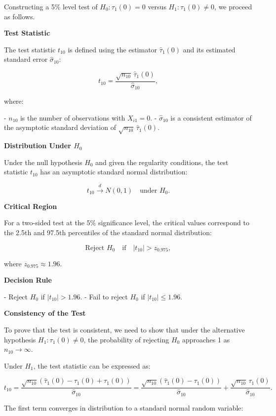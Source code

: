 \documentclass{article}
\begin{document}
Constructing a 5\% level test of \( H_0 : \tau_1(0) = 0 \) versus \( H_1 : \tau_1(0) \neq 0 \), we proceed as follows.

\textbf{Test Statistic}

The test statistic \( t_{10} \) is defined using the estimator \( \hat{\tau}_1(0) \) and its estimated standard error \( \hat{\sigma}_{10} \):

\[
t_{10} = \frac{\sqrt{n_{10}} \, \hat{\tau}_1(0)}{\hat{\sigma}_{10}},
\]

where:

- \( n_{10} \) is the number of observations with \( X_{i1} = 0 \).
- \( \hat{\sigma}_{10} \) is a consistent estimator of the asymptotic standard deviation of \( \sqrt{n_{10}} \, \hat{\tau}_1(0) \).

\textbf{Distribution Under \( H_0 \)}

Under the null hypothesis \( H_0 \) and given the regularity conditions, the test statistic \( t_{10} \) has an asymptotic standard normal distribution:

\[
t_{10} \xrightarrow{d} N(0,1) \quad \text{under } H_0.
\]

\textbf{Critical Region}

For a two-sided test at the 5\% significance level, the critical values correspond to the 2.5th and 97.5th percentiles of the standard normal distribution:

\[
\text{Reject } H_0 \quad \text{if} \quad |t_{10}| > z_{0.975},
\]

where \( z_{0.975} \approx 1.96 \).

\textbf{Decision Rule}

- Reject \( H_0 \) if \( |t_{10}| > 1.96 \).
- Fail to reject \( H_0 \) if \( |t_{10}| \leq 1.96 \).

\textbf{Consistency of the Test}

To prove that the test is consistent, we need to show that under the alternative hypothesis \( H_1: \tau_1(0) \neq 0 \), the probability of rejecting \( H_0 \) approaches 1 as \( n_{10} \to \infty \).

Under \( H_1 \), the test statistic can be expressed as:

\[
t_{10} = \frac{\sqrt{n_{10}} \left( \hat{\tau}_1(0) - \tau_1(0) + \tau_1(0) \right)}{\hat{\sigma}_{10}} = \frac{\sqrt{n_{10}} \left( \hat{\tau}_1(0) - \tau_1(0) \right)}{\hat{\sigma}_{10}} + \frac{\sqrt{n_{10}} \, \tau_1(0)}{\hat{\sigma}_{10}}.
\]

The first term converges in distribution to a standard normal random variable:
\end{document}
